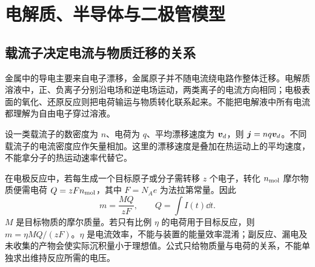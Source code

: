 \section{电解质、半导体与二极管模型}

\subsection{载流子决定电流与物质迁移的关系}
金属中的导电主要来自电子漂移，金属原子并不随电流绕电路作整体迁移。电解质溶液中，正、负离子分别沿电场和逆电场运动，两类离子的电流方向相同；电极表面的氧化、还原反应则把电荷输运与物质转化联系起来。不能把电解液中所有电流都理解为自由电子穿过溶液。

设一类载流子的数密度为 $n$、电荷为 $q$、平均漂移速度为 $\bm{v}_d$，则 $\bm{j}=nq\bm{v}_d$。不同载流子的电流密度应作矢量相加。这里的漂移速度是叠加在热运动上的平均速度，不能拿分子的热运动速率代替它。

在电极反应中，若每生成一个目标原子或分子需转移 $z$ 个电子，转化 $n_{\rm mol}$ 摩尔物质便需电荷 $Q=zF n_{\rm mol}$，其中 $F=N_Ae$ 为法拉第常量。因此
\[
 m=\frac{M Q}{zF},\qquad Q=\int I(t)\dd t.
\]
$M$ 是目标物质的摩尔质量。若只有比例 $\eta$ 的电荷用于目标反应，则 $m=\eta MQ/(zF)$。$\eta$ 是电流效率，不能与装置的能量效率混淆；副反应、漏电及未收集的产物会使实际沉积量小于理想值。公式只给物质量与电荷的关系，不能单独求出维持反应所需的电压。

